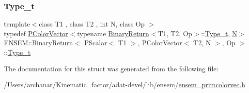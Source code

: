 \subsubsection{\texorpdfstring{Type\_t}{Type\_t}\hspace{0.1cm}{\footnotesize\ttfamily [3/3]}}
{\footnotesize\ttfamily template$<$class T1 , class T2 , int N, class Op $>$ \\
typedef \mbox{\hyperlink{classENSEM_1_1PColorVector}{P\+Color\+Vector}}$<$typename \mbox{\hyperlink{structENSEM_1_1BinaryReturn}{Binary\+Return}}$<$T1, T2, Op$>$\+::\mbox{\hyperlink{structENSEM_1_1BinaryReturn_3_01PScalar_3_01T1_01_4_00_01PColorVector_3_01T2_00_01N_01_4_00_01Op_01_4_a95a5d5601624cef9fdaf1ef812aec166}{Type\+\_\+t}}, \mbox{\hyperlink{adat__devel_2lib_2hadron_2operator__name__util_8cc_a7722c8ecbb62d99aee7ce68b1752f337}{N}}$>$ \mbox{\hyperlink{structENSEM_1_1BinaryReturn}{E\+N\+S\+E\+M\+::\+Binary\+Return}}$<$ \mbox{\hyperlink{classENSEM_1_1PScalar}{P\+Scalar}}$<$ T1 $>$, \mbox{\hyperlink{classENSEM_1_1PColorVector}{P\+Color\+Vector}}$<$ T2, \mbox{\hyperlink{adat__devel_2lib_2hadron_2operator__name__util_8cc_a7722c8ecbb62d99aee7ce68b1752f337}{N}} $>$, Op $>$\+::\mbox{\hyperlink{structENSEM_1_1BinaryReturn_3_01PScalar_3_01T1_01_4_00_01PColorVector_3_01T2_00_01N_01_4_00_01Op_01_4_a95a5d5601624cef9fdaf1ef812aec166}{Type\+\_\+t}}}



The documentation for this struct was generated from the following file\+:\begin{DoxyCompactItemize}
\item 
/\+Users/archanar/\+Kinematic\+\_\+factor/adat-\/devel/lib/ensem/\mbox{\hyperlink{adat-devel_2lib_2ensem_2ensem__primcolorvec_8h}{ensem\+\_\+primcolorvec.\+h}}\end{DoxyCompactItemize}
